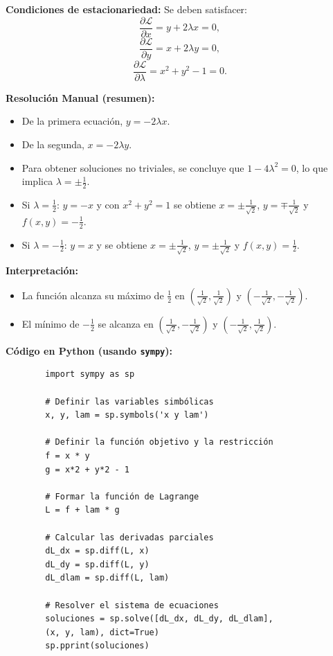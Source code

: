 \documentclass[12pt,a4,oneside]{book}
\begin{document}
	\textbf{Condiciones de estacionariedad:}  
	Se deben satisfacer:
	\[
	\frac{\partial \mathcal{L}}{\partial x} = y + 2\lambda x = 0,
	\]
	\[
	\frac{\partial \mathcal{L}}{\partial y} = x + 2\lambda y = 0,
	\]
	\[
	\frac{\partial \mathcal{L}}{\partial \lambda} = x^2 + y^2 - 1 = 0.
	\]
	
	\textbf{Resolución Manual (resumen):}
	\begin{itemize}
		\item De la primera ecuación, \(y = -2\lambda x\).
		\item De la segunda, \(x = -2\lambda y\).
		\item Para obtener soluciones no triviales, se concluye que \(1-4\lambda^2=0\), lo que implica \(\lambda = \pm \frac{1}{2}\).
		\item Si \(\lambda = \frac{1}{2}\): \(y = -x\) y con \(x^2+y^2=1\) se obtiene \(x = \pm \frac{1}{\sqrt{2}}\), \(y = \mp \frac{1}{\sqrt{2}}\) y \(f(x,y)= -\frac{1}{2}\).
		\item Si \(\lambda = -\frac{1}{2}\): \(y = x\) y se obtiene \(x = \pm \frac{1}{\sqrt{2}}\), \(y = \pm \frac{1}{\sqrt{2}}\) y \(f(x,y)= \frac{1}{2}\).
	\end{itemize}
	
	\textbf{Interpretación:}  
	\begin{itemize}
		\item La función alcanza su máximo de \(\frac{1}{2}\) en \(\left(\frac{1}{\sqrt{2}},\frac{1}{\sqrt{2}}\right)\) y \(\left(-\frac{1}{\sqrt{2}},-\frac{1}{\sqrt{2}}\right)\).
		\item El mínimo de \(-\frac{1}{2}\) se alcanza en \(\left(\frac{1}{\sqrt{2}},-\frac{1}{\sqrt{2}}\right)\) y \(\left(-\frac{1}{\sqrt{2}},\frac{1}{\sqrt{2}}\right)\).
	\end{itemize}
	
	\textbf{Código en Python (usando \texttt{sympy}):}
	\begin{verbatim}
		import sympy as sp
		
		# Definir las variables simbólicas
		x, y, lam = sp.symbols('x y lam')
		
		# Definir la función objetivo y la restricción
		f = x * y
		g = x*2 + y*2 - 1
		
		# Formar la función de Lagrange
		L = f + lam * g
		
		# Calcular las derivadas parciales
		dL_dx = sp.diff(L, x)
		dL_dy = sp.diff(L, y)
		dL_dlam = sp.diff(L, lam)
		
		# Resolver el sistema de ecuaciones
		soluciones = sp.solve([dL_dx, dL_dy, dL_dlam],
	    (x, y, lam), dict=True)
		sp.pprint(soluciones)
	\end{verbatim}
	
\end{document}
